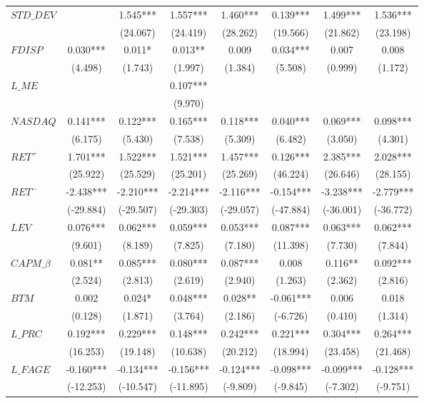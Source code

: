 \begin{xltabular}{\linewidth}{X * {7}{S[table-format=4.3]}}
\endfoot
\bottomrule
\endlastfoot
$STD\_DEV$ &  & 1.545*** & 1.557*** & 1.460*** & 0.139*** & 1.499*** & 1.536***\\
 &  & (24.067) & (24.419) & (28.262) & (19.566) & (21.862) & (23.198)\\
$FDISP$ & 0.030*** & 0.011* & 0.013** & 0.009 & 0.034*** & 0.007 & 0.008\\
 & (4.498) & (1.743) & (1.997) & (1.384) & (5.508) & (0.999) & (1.172)\\
$L\_ME$ &  &  & 0.107*** &  &  &  & \\
\addlinespace
 &  &  & (9.970) &  &  &  & \\
$NASDAQ$ & 0.141*** & 0.122*** & 0.165*** & 0.118*** & 0.040*** & 0.069*** & 0.098***\\
 & (6.175) & (5.430) & (7.538) & (5.309) & (6.482) & (3.050) & (4.301)\\
$RET^+$ & 1.701*** & 1.522*** & 1.521*** & 1.457*** & 0.126*** & 2.385*** & 2.028***\\
 & (25.922) & (25.529) & (25.201) & (25.269) & (46.224) & (26.646) & (28.155)\\
\addlinespace
$RET^-$ & -2.438*** & -2.210*** & -2.214*** & -2.116*** & -0.154*** & -3.238*** & -2.779***\\
 & (-29.884) & (-29.507) & (-29.303) & (-29.057) & (-47.884) & (-36.001) & (-36.772)\\
$LEV$ & 0.076*** & 0.062*** & 0.059*** & 0.053*** & 0.087*** & 0.063*** & 0.062***\\
 & (9.601) & (8.189) & (7.825) & (7.180) & (11.398) & (7.730) & (7.844)\\
$CAPM\_\beta$ & 0.081** & 0.085*** & 0.080*** & 0.087*** & 0.008 & 0.116** & 0.092***\\
\addlinespace
 & (2.524) & (2.813) & (2.619) & (2.940) & (1.263) & (2.362) & (2.816)\\
$BTM$ & 0.002 & 0.024* & 0.048*** & 0.028** & -0.061*** & 0.006 & 0.018\\
 & (0.128) & (1.871) & (3.764) & (2.186) & (-6.726) & (0.410) & (1.314)\\
$L\_PRC$ & 0.192*** & 0.229*** & 0.148*** & 0.242*** & 0.221*** & 0.304*** & 0.264***\\
 & (16.253) & (19.148) & (10.638) & (20.212) & (18.994) & (23.458) & (21.468)\\
\addlinespace
$L\_FAGE$ & -0.160*** & -0.134*** & -0.156*** & -0.124*** & -0.098*** & -0.099*** & -0.128***\\
 & (-12.253) & (-10.547) & (-11.895) & (-9.809) & (-9.845) & (-7.302) & (-9.751)\\

\end{xltabular}
